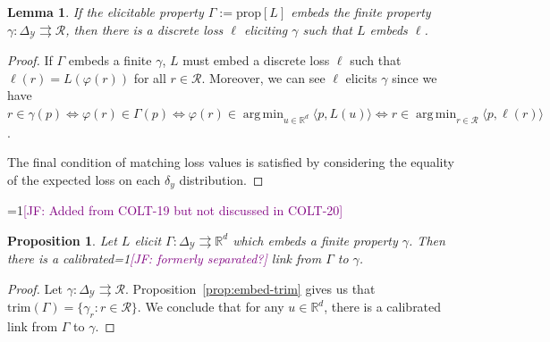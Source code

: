 \documentclass[12pt]{article}
\newcommand{\Comments}{1}
\newcommand{\mynote}[2]{\ifnum\Comments=1\textcolor{#1}{#2}\fi}
\newcommand{\jessie}[1]{\mynote{purple}{[JF: #1]}}
\newcommand{\reals}{\mathbb{R}}
\newcommand{\prop}[1]{\mathrm{prop}[#1]}
\newcommand{\simplex}{\Delta_\Y}
\newcommand{\R}{\mathcal{R}}
\newcommand{\Y}{\mathcal{Y}}
\newcommand{\inprod}[2]{\langle #1, #2 \rangle}%
\newcommand{\toto}{\rightrightarrows}
\newcommand{\trim}{\mathrm{trim}}
\DeclareMathOperator*{\argmin}{arg\,min}
\newtheorem{lemma}{Lemma}
\newtheorem{proposition}{Proposition}
\begin{document}
\begin{lemma}\label{lem:embed-defs-equiv}
	If the elicitable property $\Gamma := \prop{L}$ embeds the finite property $\gamma : \simplex \toto \R$, then there is a discrete loss $\ell$ eliciting $\gamma$ such that $L$ embeds $\ell$.
\end{lemma}
\begin{proof}
	If $\Gamma$ embeds a finite $\gamma$, $L$ must embed a discrete loss $\ell$ such that $\ell(r) = L(\varphi(r))$ for all $r \in \R$.  
	Moreover, we can see $\ell$ elicits $\gamma$ since we have $r \in \gamma(p) \iff \varphi(r) \in \Gamma(p) \iff \varphi(r) \in \argmin_{u \in \reals^d} \inprod{p}{L(u)} \iff r \in \argmin_{r \in \R} \inprod{p}{\ell(r)}$.
	
	The final condition of matching loss values is satisfied by considering the equality of the expected loss on each $\delta_y$ distribution.
\end{proof}



\jessie{Added from COLT-19 but not discussed in COLT-20}

\begin{proposition}
	Let $L$ elicit $\Gamma:\simplex \toto \reals^d$ which embeds a finite property $\gamma$.
	Then there is a calibrated\jessie{formerly separated?} link from $\Gamma$ to $\gamma$.
\end{proposition}
\begin{proof}
	Let $\gamma: \simplex \toto \R$.
	Proposition~\ref{prop:embed-trim} gives us that $\trim(\Gamma) = \{\gamma_r : r \in \R\}$.
	We conclude that for any $u \in \reals^d$, there is a calibrated link from $\Gamma$ to $\gamma$.
\end{proof}
\end{document}
